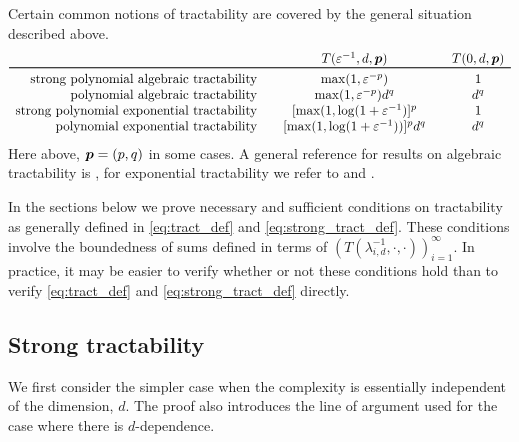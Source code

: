 \documentclass[11pt,a4paper]{article}
\newcommand{\peter}[1]{\begingroup\color{purple}#1\endgroup}
\begin{document}
Certain common notions of tractability are covered by the general situation described above.
\begin{equation*}
	\begin{array}{r@{\qquad}c@{\qquad}cc}
		& T(\varepsilon^{-1},d,\vp)
		& T(0,d,\vp)\\
		\toprule
		\text{strong polynomial algebraic  tractability} & \max(1,\varepsilon^{-p}) & 1\\
		\text{polynomial algebraic tractability} & \max(1,\varepsilon^{-p})d^{q} & d^{q}\\
		\text{strong polynomial exponential tractability} &  [\max(1,\log(1 + \varepsilon^{-1})]^p & 1\\
		\text{polynomial exponential tractability} &
		[\max(1,\log(1 + \varepsilon^{-1}))]^p  d^{q} & d^{q}
	\end{array}
\end{equation*}
Here above, $\boldsymbol{p} = (p,q)$ in some cases. \peter{A general reference 
for results on algebraic tractability is \cite{NW08}, for exponential tractability we refer to \cite{HKW19} and \cite{KW19}.}


In the sections below we prove necessary and sufficient conditions on tractability as generally defined in \eqref{eq:tract_def} and \eqref{eq:strong_tract_def}.  These conditions involve the boundedness of sums defined in terms of \peter{$(T(\lambda_{i,d}^{-1},\cdot, \cdot))_{i=1}^\infty$}.  In practice, it may be easier to verify whether or not these conditions hold than to verify \peter{\eqref{eq:tract_def} and \eqref{eq:strong_tract_def}} directly.




\subsection{Strong tractability}

We first consider the simpler case when the complexity is essentially independent of the dimension, $d$.  The proof also introduces the line of argument used for the case where there is $d$-dependence.
\end{document}
